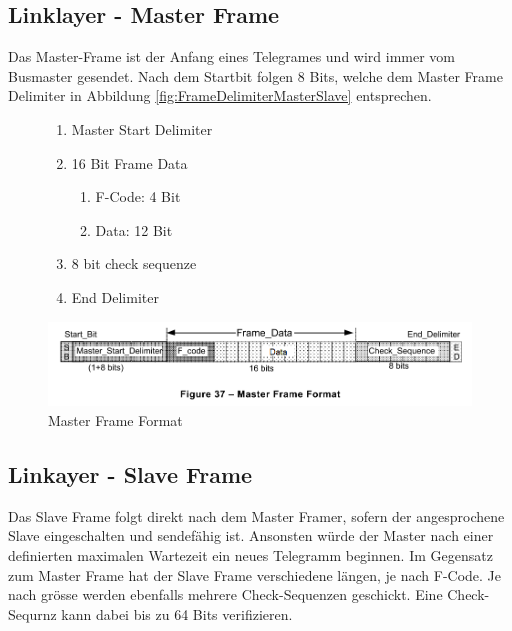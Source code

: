 
\subsection{Linklayer - Master Frame}
\label{sub:MasterFrame}
Das Master-Frame ist der Anfang eines Telegrames und wird immer vom Busmaster gesendet. Nach dem Startbit folgen 8 Bits, welche dem Master Frame Delimiter in Abbildung \ref{fig:FrameDelimiterMasterSlave} entsprechen. 

\begin{figure}[H]
    \centering
    \begin{minipage}{0.33 \textwidth}
        \centering
        \begin{enumerate}
            \item Master Start Delimiter
            \item 16 Bit Frame Data
            \begin{enumerate}
                \item F-Code: 4 Bit
                \item Data: 12 Bit
            \end{enumerate}
            \item 8 bit check sequenze 
            \item End Delimiter
        \end{enumerate}
    \end{minipage}
    \hfill
    \begin{minipage}{0.65 \textwidth}
        \includegraphics[width = \textwidth]{Figures/Chap2/Grundlagen/MVB_DOKU/Frames und Telegramme/Fig37_MasterFrameFormat.png}
        \caption{Master Frame Format}
        \label{fig:MasterFrameFormat}
    \end{minipage}
        
\end{figure}

\subsection{Linkayer - Slave Frame}
\label{sub:SlaveFrame}
Das Slave Frame folgt direkt nach dem Master Framer, sofern der angesprochene Slave eingeschalten und sendefähig ist. Ansonsten würde der Master nach einer definierten maximalen Wartezeit ein neues Telegramm beginnen. \newline
Im Gegensatz zum Master Frame hat der Slave Frame verschiedene längen, je nach F-Code. Je nach grösse werden ebenfalls mehrere Check-Sequenzen geschickt. Eine Check-Sequrnz kann dabei bis zu 64 Bits verifizieren.

